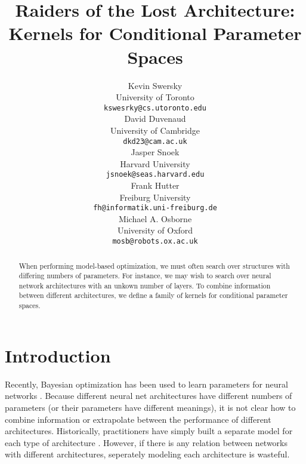 \documentclass{article}
\begin{document}
\title{Raiders of the Lost Architecture:\\Kernels for Conditional Parameter Spaces}

\author{
Kevin Swersky \\
University of Toronto \\
\texttt{kswesrky@cs.utoronto.edu} \\
\And
David Duvenaud \\
University of Cambridge \\
\texttt{dkd23@cam.ac.uk} \\
\And
Jasper Snoek\\
Harvard University \\
\texttt{jsnoek@seas.harvard.edu} \\
\AND
Frank Hutter  \\
Freiburg University \\
{\tt fh@informatik.uni-freiburg.de} \\
\And
Michael A. Osborne \\
University of Oxford \\
{\tt mosb@robots.ox.ac.uk} \\
}




\maketitle
\begin{abstract}
When performing model-based optimization, we must often search over structures with differing numbers of parameters.  For instance, we may wish to search over neural network architectures with an unkown number of layers.  To combine information between different architectures, we define a family of kernels for conditional parameter spaces.
\end{abstract}



\section{Introduction}

Recently, Bayesian optimization has been used to learn parameters for neural networks \cite{snoek-etal-2012b}.
Because different neural net architectures have different numbers of parameters (or their parameters have different meanings), it is not clear how to combine information or extrapolate between the performance of different architectures.
Historically, practitioners have simply built a separate model for each type of architecture \cite{bergstra2011algorithms}.  However, if there is any relation between networks with different architectures, seperately modeling each architecture is wasteful.
\end{document}
